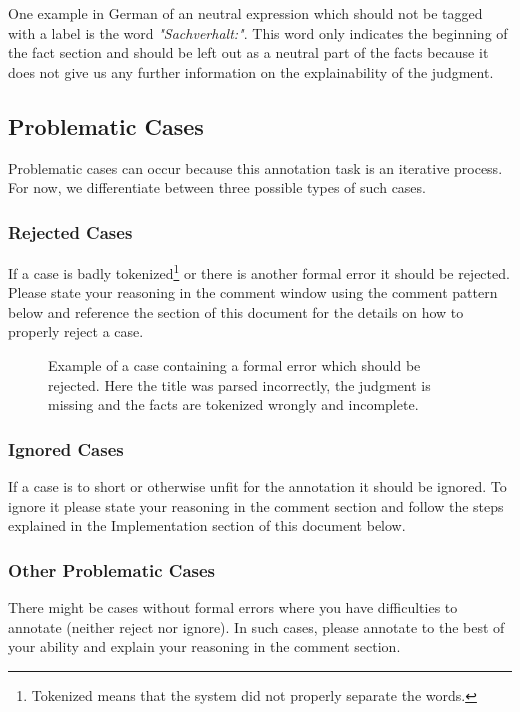 \documentclass{article}
\begin{document}
One example in German of an neutral expression which should not be tagged with a label is the word \emph{"Sachverhalt:"}. This word only indicates the beginning of the fact section and should be left out as a neutral part of the facts because it does not give us any further information on the explainability of the judgment. 

\subsection{Problematic Cases}
Problematic cases can occur because this annotation task is an iterative process. For now, we differentiate between three possible types of such cases.

\subsubsection{Rejected Cases}
If a case is badly tokenized\footnote{Tokenized means that the system did not properly separate the words.} or there is another formal error it should be rejected. Please state your reasoning in the comment window using the comment pattern below and reference the  section of this document for the details on how to properly reject a case.
\begin{figure}[h!]
     \caption{Example of a case containing a formal error which should be rejected. Here the title was parsed incorrectly, the judgment is missing and the facts are tokenized wrongly and incomplete.}
\end{figure}

\subsubsection{Ignored Cases}
If a case is to short or otherwise unfit for the annotation it should be ignored. To ignore it please state your reasoning in the comment section and follow the steps explained in the Implementation section of this document below. 

\subsubsection{Other Problematic Cases}
There might be cases without formal errors where you have difficulties to annotate (neither reject nor ignore). In such cases, please annotate to the best of your ability and explain your reasoning in the comment section.
\end{document}

